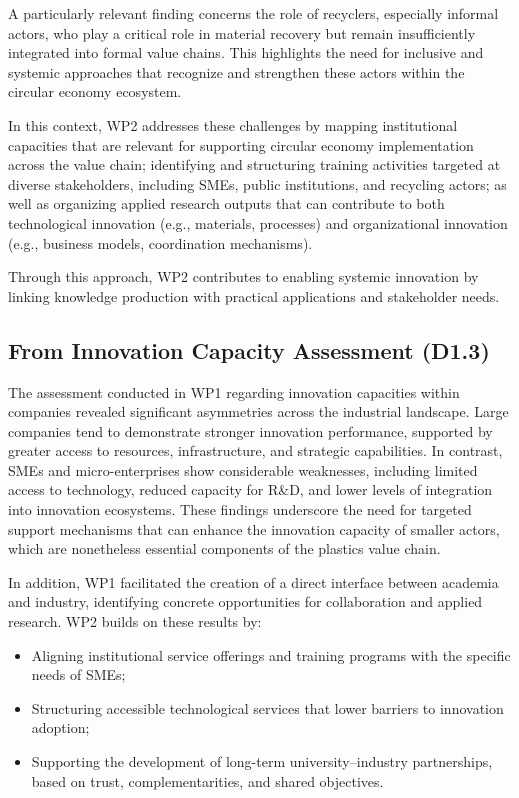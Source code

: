 \documentclass[
  12pt,
  oneside]{book}
\newcounter{none} %
\providecommand{\tightlist}{%
  \setlength{\itemsep}{0pt}\setlength{\parskip}{0pt}}
\begin{document}
A particularly relevant finding concerns the role of recyclers,
especially informal actors, who play a critical role in material
recovery but remain insufficiently integrated into formal value chains.
This highlights the need for inclusive and systemic approaches that
recognize and strengthen these actors within the circular economy
ecosystem.

In this context, WP2 addresses these challenges by mapping institutional
capacities that are relevant for supporting circular economy
implementation across the value chain; identifying and structuring
training activities targeted at diverse stakeholders, including SMEs,
public institutions, and recycling actors; as well as organizing applied
research outputs that can contribute to both technological innovation
(e.g., materials, processes) and organizational innovation (e.g.,
business models, coordination mechanisms).

Through this approach, WP2 contributes to enabling systemic innovation
by linking knowledge production with practical applications and
stakeholder needs.

\subsection{From Innovation Capacity Assessment
(D1.3)}\label{from-innovation-capacity-assessment-d1.3}

The assessment conducted in WP1 regarding innovation capacities within
companies revealed significant asymmetries across the industrial
landscape. Large companies tend to demonstrate stronger innovation
performance, supported by greater access to resources, infrastructure,
and strategic capabilities. In contrast, SMEs and micro-enterprises show
considerable weaknesses, including limited access to technology, reduced
capacity for R\&D, and lower levels of integration into innovation
ecosystems. These findings underscore the need for targeted support
mechanisms that can enhance the innovation capacity of smaller actors,
which are nonetheless essential components of the plastics value chain.

In addition, WP1 facilitated the creation of a direct interface between
academia and industry, identifying concrete opportunities for
collaboration and applied research. WP2 builds on these results by:

\begin{itemize}
\tightlist
\item
  Aligning institutional service offerings and training programs with
  the specific needs of SMEs;
\item
  Structuring accessible technological services that lower barriers to
  innovation adoption;
\item
  Supporting the development of long-term university--industry
  partnerships, based on trust, complementarities, and shared
  objectives.
\end{itemize}
\end{document}
